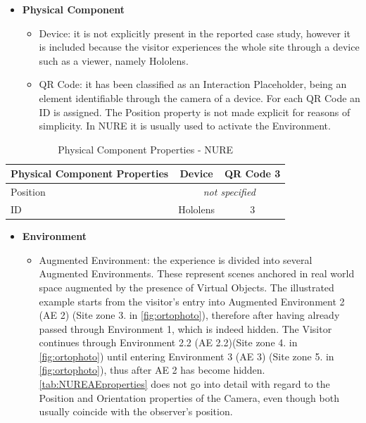 \begin{itemize}
    \item \textbf{Physical Component}
    \begin{itemize}
        \item Device: it is not explicitly present in the reported case study, however it is included because the visitor experiences the whole site through a device such as a viewer, namely Hololens.
        \item QR Code: it has been classified as an Interaction Placeholder, being an element identifiable through the camera of a device. For each QR Code an ID is assigned. The Position property is not made explicit for reasons of simplicity. In NURE it is usually used to activate the Environment.
    \end{itemize}
\end{itemize}

\begin{table}[h]
\centering
\begin{tabular}{|l|c|c|}
\hline
\textbf{Physical Component Properties} & \textbf{Device}     & \textbf{QR Code 3}    \\ \hline
Position                               & \multicolumn{2}{c|}{\textit{not specified}} \\ \hline
ID                                     & Hololens            & 3                     \\ \hline
\end{tabular}
\caption{Physical Component Properties - NURE}
\label{tab:NUREPHCproperties}
\end{table}

\begin{itemize}
    \item \textbf{Environment}
    \begin{itemize}
        \item Augmented Environment: the experience is divided into several Augmented Environments. These represent scenes anchored in real world space augmented by the presence of Virtual Objects. The illustrated example starts from the visitor's entry into Augmented Environment 2 (AE 2) (Site zone 3. in \autoref{fig:ortophoto}), therefore after having already passed through Environment 1, which is indeed hidden. The Visitor continues through Environment 2.2 (AE 2.2)(Site zone 4. in \autoref{fig:ortophoto}) until entering Environment 3 (AE 3) (Site zone 5. in \autoref{fig:ortophoto}), thus after AE 2 has become hidden. 
        \autoref{tab:NUREAEproperties} does not go into detail with regard to the Position and Orientation properties of the Camera, even though both usually coincide with the observer's position.
    \end{itemize}
\end{itemize}

